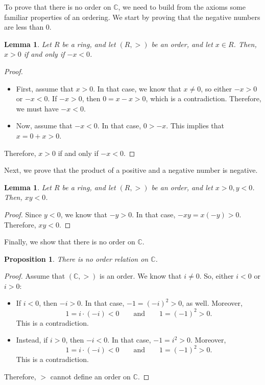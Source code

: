 \documentclass[a4paper, openany]{memoir}
\theoremstyle{definition}
\theoremstyle{plain}
\newtheorem{lemma}[definition]{Lemma}
\newtheorem{proposition}[definition]{Proposition}
\begin{document}
\noindent To prove that there is no order on $\mathbb{C}$, we need to build from the axioms some familiar properties of an ordering. We start by proving that the negative numbers are less than 0.
\begin{lemma}
Let $R$ be a ring, and let $(R, >)$ be an order, and let $x \in R$. Then, $x > 0$ if and only if $-x < 0$.
\end{lemma}
\begin{proof}
\hspace*{0pt}
\begin{itemize}
    \item First, assume that $x > 0$. In that case, we know that $x \neq 0$, so either $-x > 0$ or $-x < 0$. If $-x > 0$, then $0 = x - x > 0$, which is a contradiction. Therefore, we must have $-x < 0$.
    
    \item Now, assume that $-x < 0$. In that case, $0 > -x$. This implies that $x = 0 + x > 0$.
\end{itemize}
Therefore, $x > 0$ if and only if $-x < 0$.
\end{proof}
\noindent Next, we prove that the product of a positive and a negative number is negative.
\begin{lemma}
Let $R$ be a ring, and let $(R, >)$ be an order, and let $x > 0, y < 0$. Then, $xy < 0$.
\end{lemma}
\begin{proof}
Since $y < 0$, we know that $-y > 0$. In that case, $-xy = x(-y) > 0$. Therefore, $xy < 0$.
\end{proof}
\noindent Finally, we show that there is no order on $\mathbb{C}$.
\begin{proposition}
There is no order relation on $\mathbb{C}$.
\end{proposition}
\begin{proof}
Assume that $(\mathbb{C}, >)$ is an order. We know that $i \neq 0$. So, either $i < 0$ or $i > 0$:
\begin{itemize}
    \item If $i < 0$, then $-i > 0$. In that case, $-1 = (-i)^2 > 0$, as well. Moreover,
    \[1 = i \cdot (-i) < 0 \qquad \text{and} \qquad 1 = (-1)^2 > 0.\]
    This is a contradiction.
    
    \item Instead, if $i > 0$, then $-i < 0$. In that case, $-1 = i^2 > 0$. Moreover,
    \[1 = i \cdot (-i) < 0 \qquad \text{and} \qquad 1 = (-1)^2 > 0.\]
    This is a contradiction.
\end{itemize}
Therefore, $>$ cannot define an order on $\mathbb{C}$.
\end{proof}
\newpage
\end{document}

